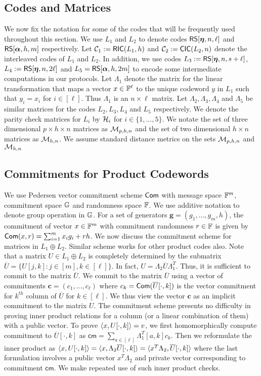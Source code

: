 \subsection{Codes and Matrices}\label{sec:codesandmatrices}
We now fix the notation for some of the codes that will be
frequently used throughout this section. We use $L_1$ and $L_2$ to denote codes
$\mathsf{RS}[\bm{\eta},n,\ell]$ and $\mathsf{RS}[\bm{\alpha},h,m]$ respectively. Let $\mathcal{C}_1 := \mathsf{RIC}(L_1,h)$ 
and $\mathcal{C}_2 :=\mathsf{CIC}(L_2,n)$ denote the interleaved codes of $L_1$ and $L_2$. In addition, 
we use codes $L_3 := \mathsf{RS}[\bm{\eta},n,s+\ell]$, $L_4 := \mathsf{RS}[\bm{\eta},n,2\ell]$ and 
$L_5=\mathsf{RS}[\bm{\alpha},h,2m]$ to encode some intermediate computations in our protocols.
Let $\Lambda_1$ denote the matrix for the linear transformation that maps a vector $x\in \mathbb{F}^\ell$ 
to the unique codeword $y$ in $L_1$ such that $y_i=x_i$ for $i\in [\ell]$. Thus $\Lambda_1$ is 
an $n\times \ell$ matrix. Let $\Lambda_2,\Lambda_3,\Lambda_4$ and $\Lambda_5$ be similar matrices
for the codes $L_2,L_3,L_4$ and $L_5$ respectively. We denote the
parity check matrices for $L_i$  by $\mathcal{H}_i$ for $i\in \{1,\ldots,5\}$. 
We notate the set of three dimensional $p\times h\times n$ matrices as $\mathcal{M}_{p,h,n}$ and
the set of two dimensional $h\times n$ matrices as $\mathcal{M}_{h, n}$. We
assume standard distance metrics on the sets $\mathcal{M}_{p,h,n}$ and $\mathcal{M}_{h,n}$

\subsection{Commitments for Product Codewords}\label{sec:matrixcommitment}
We use Pedersen vector commitment scheme $\mathsf{Com}$ with message space $\mathbb{F}^m$,
commitment space $\mathbb{G}$ and randomness space $\mathbb{F}$. We use additive notation to
denote group operation in $\mathbb{G}$. For a set of generators
$\bm{g}=(g_1,\ldots,g_m,h)$, the commitment of vector $x\in \mathbb{F}^m$ with commitment
randomness $r\in \mathbb{F}$ is given by $\mathsf{Com}(x,r)=\sum_{i=1}^m x_ig_i + rh$.
We now discuss the commitment scheme
for matrices in $L_1\oplus L_2$. Similar scheme works for other product codes also. 
Note that a matrix $U\in L_1\oplus L_2$ is
completely determined by the submatrix $\overline{U}=\{U[j,k]: j\in [m], k\in [\ell]\}$.
In fact, $U=\Lambda_2\overline{U}\Lambda_1^T$. Thus, it is sufficient to commit to the matrix $\overline{U}$. We commit to the
matrix $\overline{U}$ using a vector of commitments $\bm{c}=(c_1,\ldots,c_\ell)$
where $c_k=\mathsf{Com}(\overline{U}[\cdot,k])$ is the vector commitment for $k^{th}$
column of $\overline{U}$ for $k\in [\ell]$. We thus view the vector $\bm{c}$ as 
an implicit commitment to the matrix $U$. The commitment scheme presents no difficulty in 
proving inner product relations for a column (or a linear combination of them) with a public vector.
To prove $\langle x,U[\cdot,k]\rangle=v$, we first homomorphically compute commitment
to $\overline{U}[\cdot,k]$ as $\mathsf{cm}=\sum_{a\in [\ell]}\Lambda_1^T[a,k]c_k$. 
Then we reformulate the inner product as 
$\langle x,U[\cdot,k]\rangle=\langle x,\Lambda_2\overline{U}[\cdot,k]\rangle=\langle x^T\Lambda_2,\overline{U}[\cdot,k]\rangle$ where the last formulation involves a public vector $x^T\Lambda_2$ and private vector corresponding to commitment $\mathsf{cm}$. We make repeated use of such inner product checks.   

